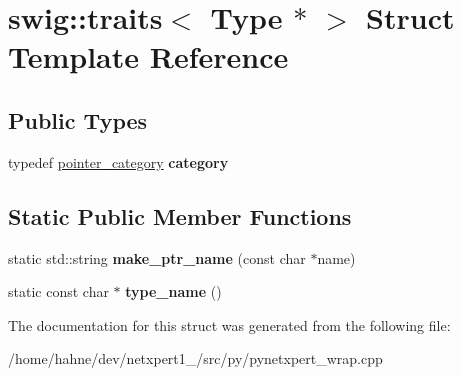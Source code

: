 \hypertarget{structswig_1_1traits_3_01Type_01_5_01_4}{}\section{swig\+:\+:traits$<$ Type $\ast$ $>$ Struct Template Reference}
\label{structswig_1_1traits_3_01Type_01_5_01_4}
\subsection*{Public Types}
\begin{DoxyCompactItemize}
\item 
typedef \hyperlink{structswig_1_1pointer__category}{pointer\+\_\+category} {\bfseries category}\hypertarget{structswig_1_1traits_3_01Type_01_5_01_4_a500d091f0454ce9f328c030b191ac18f}{}\label{structswig_1_1traits_3_01Type_01_5_01_4_a500d091f0454ce9f328c030b191ac18f}

\end{DoxyCompactItemize}
\subsection*{Static Public Member Functions}
\begin{DoxyCompactItemize}
\item 
static std\+::string {\bfseries make\+\_\+ptr\+\_\+name} (const char $\ast$name)\hypertarget{structswig_1_1traits_3_01Type_01_5_01_4_a5251b3fb5f48a5a48f17c25cafe21817}{}\label{structswig_1_1traits_3_01Type_01_5_01_4_a5251b3fb5f48a5a48f17c25cafe21817}

\item 
static const char $\ast$ {\bfseries type\+\_\+name} ()\hypertarget{structswig_1_1traits_3_01Type_01_5_01_4_ac5aae8203a9a4b151f6719e58a0cc252}{}\label{structswig_1_1traits_3_01Type_01_5_01_4_ac5aae8203a9a4b151f6719e58a0cc252}

\end{DoxyCompactItemize}


The documentation for this struct was generated from the following file\+:\begin{DoxyCompactItemize}
\item 
/home/hahne/dev/netxpert1\+\_/src/py/pynetxpert\+\_\+wrap.\+cpp\end{DoxyCompactItemize}

